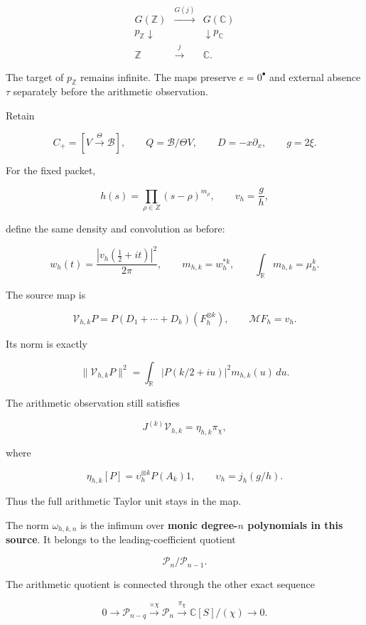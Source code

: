 \[
\boxed{
\begin{array}{ccc}
G(\mathbb Z)&\xrightarrow{G(j)}&G(\mathbb C)\\
p_{\mathbb Z}\downarrow&&\downarrow p_{\mathbb C}\\
\mathbb Z&\xrightarrow{j}&\mathbb C.
\end{array}
}
\]

The target of \(p_{\mathbb Z}\) remains infinite. The maps preserve \(e=0^\bullet\) and external absence \(\tau\) separately before the arithmetic observation.

Retain

\[
C_+=[V\xrightarrow{\Theta}\mathscr B],
\qquad
Q=\mathscr B/\Theta V,
\qquad
D=-x\partial_x,
\qquad
g=2\xi.
\]

For the fixed packet,

\[
h(s)=\prod_{\rho\in Z}(s-\rho)^{m_\rho},
\qquad
v_h=\frac gh,
\]

define the same density and convolution as before:

\[
\boxed{
w_h(t)=\frac{|v_h(\tfrac12+it)|^2}{2\pi},
\qquad
m_{h,k}=w_h^{*k},
\qquad
\int_{\mathbb R}m_{h,k}=\mu_h^k.
}
\]

The source map is

\[
\mathcal V_{h,k}P
=
P(D_1+\cdots+D_k)(F_h^{\otimes k}),
\qquad
\mathcal MF_h=v_h.
\]

Its norm is exactly

\[
\|\mathcal V_{h,k}P\|^2
=
\int_{\mathbb R}
|P(k/2+iu)|^2m_{h,k}(u)\,du.
\]

The arithmetic observation still satisfies

\[
\boxed{
J^{(k)}\mathcal V_{h,k}
=
\eta_{h,k}\pi_\chi,
}
\]

where

\[
\eta_{h,k}[P]
=
\upsilon_h^{\otimes k}P(A_k)1,
\qquad
\upsilon_h=j_h(g/h).
\]

Thus the full arithmetic Taylor unit stays in the map.

The norm \(\omega_{h,k,n}\) is the infimum over \textbf{monic degree-\(n\) polynomials in this source}. It belongs to the leading-coefficient quotient

\[
\mathcal P_n/\mathcal P_{n-1}.
\]

The arithmetic quotient is connected through the other exact sequence

\[
\boxed{
0\longrightarrow\mathcal P_{n-q}
\xrightarrow{\times\chi}
\mathcal P_n
\xrightarrow{\pi_\chi}
\mathbb C[S]/(\chi)
\longrightarrow0.
}
\]

